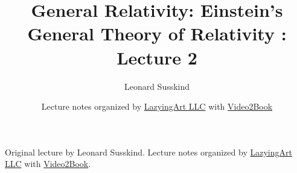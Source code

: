 \documentclass[11pt,oneside]{book}
\begin{document}
\frontmatter
\title{General Relativity: Einstein's General Theory of Relativity : Lecture 2}
\author{Leonard Susskind}
\date{Lecture notes organized by \href{https://lazying.art}{LazyingArt LLC} with \href{https://github.com/lachlanchen/Video2Book}{Video2Book}}
\maketitle
\begin{center}
\small Original lecture by Leonard Susskind. Lecture notes organized by \href{https://lazying.art}{LazyingArt LLC} with \href{https://github.com/lachlanchen/Video2Book}{Video2Book}.
\end{center}
\clearpage
\mainmatter

\end{document}
